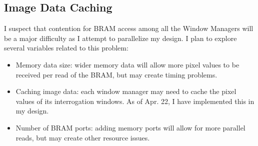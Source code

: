 \documentclass{article}
\begin{document}
\subsection{Image Data Caching}
I suspect that contention for BRAM access among all the Window Managers will be a major difficulty as I attempt to parallelize my design. I plan to explore several variables related to this problem: 
\begin{itemize}
	\item Memory data size: wider memory data will allow more pixel values to be received per read of the BRAM, but may create timing problems.
	\item Caching image data: each window manager may need to cache the pixel values of its interrogation windows. As of Apr. 22, I have implemented this in my design.
	\item Number of BRAM ports: adding memory ports will allow for more parallel reads, but may create other resource issues.
\end{itemize}

	
	
\end{document}
